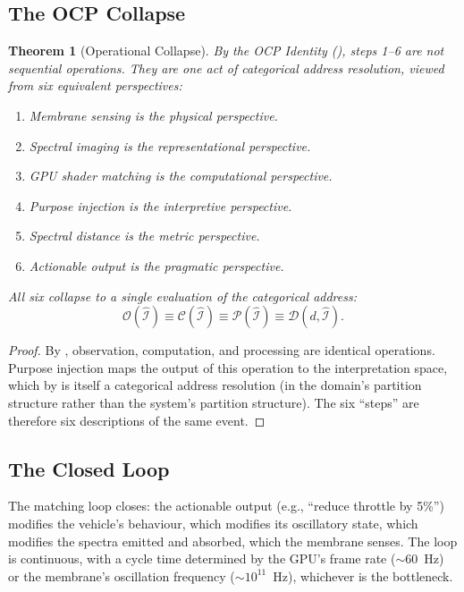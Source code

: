 \documentclass[11pt,twocolumn,a4paper]{article}
\newtheorem{theorem}{Theorem}[section]
\theoremstyle{definition}
\theoremstyle{remark}
\newcommand{\Obs}{\mathcal{O}}
\newcommand{\Comp}{\mathcal{C}}
\newcommand{\Proc}{\mathcal{P}}
\begin{document}
\subsection{The OCP Collapse}

\begin{theorem}[Operational Collapse]\label{thm:operational-collapse}
By the OCP Identity (), steps 1--6 are not sequential operations.  They are one act of categorical address resolution, viewed from six equivalent perspectives:
\begin{enumerate}[label=(\roman*)]
    \item Membrane sensing is the physical perspective.
    \item Spectral imaging is the representational perspective.
    \item GPU shader matching is the computational perspective.
    \item Purpose injection is the interpretive perspective.
    \item Spectral distance is the metric perspective.
    \item Actionable output is the pragmatic perspective.
\end{enumerate}
All six collapse to a single evaluation of the categorical address:
\begin{equation}\label{eq:operational-collapse}
    \Obs(\hat{\mathcal{I}}) \equiv \Comp(\hat{\mathcal{I}}) \equiv \Proc(\hat{\mathcal{I}}) \equiv \mathcal{D}(d, \hat{\mathcal{I}}).
\end{equation}
\end{theorem}

\begin{proof}
By , observation, computation, and processing are identical operations.  Purpose injection maps the output of this operation to the interpretation space, which by  is itself a categorical address resolution (in the domain's partition structure rather than the system's partition structure).  The six ``steps'' are therefore six descriptions of the same event.
\end{proof}

\subsection{The Closed Loop}

The matching loop closes: the actionable output (e.g., ``reduce throttle by 5\%'') modifies the vehicle's behaviour, which modifies its oscillatory state, which modifies the spectra emitted and absorbed, which the membrane senses.  The loop is continuous, with a cycle time determined by the GPU's frame rate ($\sim$60~Hz) or the membrane's oscillation frequency ($\sim 10^{11}$~Hz), whichever is the bottleneck.
\end{document}
